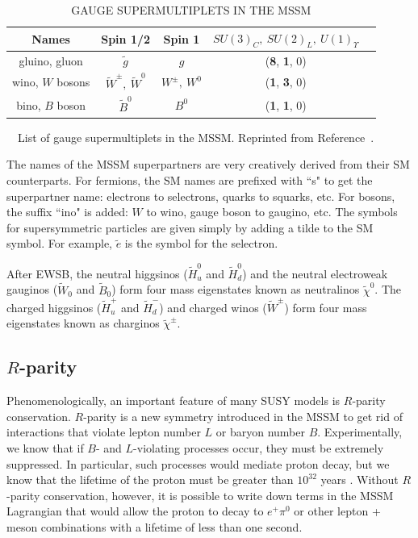 \begin{table}[ht]
    \caption{GAUGE SUPERMULTIPLETS IN THE MSSM}
    \centering
        \begin{threeparttable}
    \begin{tabular}{|c|c|c|c|c|}
    \hline
    \hline
    Names & Spin 1/2 & Spin 1 &$SU(3)_C,~SU(2)_L,~U(1)_\Upsilon $\\
  	  \hline
           \hline    
gluino, gluon & $\tilde{g}$ & $g$   & (\textbf{8}, \textbf{1}, 0) \\
\hline
wino, $W$ bosons & $\widetilde{W}^\pm,~\widetilde{W}^0$ & $W^\pm,~W^0$ & (\textbf{1}, \textbf{3}, 0) \\
\hline
bino, $B$ boson & $\widetilde{B}^0$ & $B^0$ & (\textbf{1}, \textbf{1}, 0) \\
           \hline
           \hline
    \end{tabular}
    \label{tab:SUSY_bosons}
        \begin{tablenotes}
\footnotesize
\item{~~List of gauge supermultiplets in the MSSM. Reprinted from Reference~\cite{SUSYprimer}.}
\end{tablenotes}
\end{threeparttable}
\end{table}

The names of the MSSM superpartners are very creatively derived from their SM counterparts. For fermions, the SM names are prefixed with ``s" to get the superpartner name: electrons to selectrons, quarks to squarks, etc. For bosons, the suffix ``ino" is added: $W$ to wino, gauge boson to gaugino, etc. The symbols for supersymmetric particles are given simply by adding a tilde to the SM symbol. For example, $\tilde{e}$ is the symbol for the selectron.

After EWSB, the neutral higgsinos ($\widetilde{H}_u^0$ and $\widetilde{H}_d^0$) and the neutral electroweak gauginos ($\widetilde{W}_0$ and $\widetilde{B}_0$) form four mass eigenstates known as neutralinos $\widetilde{\chi}^0$. The charged higgsinos ($\widetilde{H}_u^+$ and $\widetilde{H}_d^-$) and charged winos ($\widetilde{W}^\pm$) form four mass eigenstates known as charginos $\widetilde{\chi}^\pm$. 



\subsection{$R$-parity}
\label{sec:Rparity}
Phenomenologically, an important feature of many SUSY models is $R$-parity conservation.
$R$-parity is a new symmetry introduced in the MSSM to get rid of interactions that violate lepton number $L$
or baryon number $B$. 
Experimentally, we know that if $B$- and $L$-violating processes occur, they must be extremely suppressed. 
In particular, such processes would mediate proton decay, but we know that the 
lifetime of the proton must be greater than $10^{32}$ years \cite{SUSYprimer}. 
Without $R$-parity conservation, however, it is possible to write down terms in the MSSM Lagrangian 
that would allow the proton to decay to $e^+\pi^0$ or other 
lepton + meson combinations with a lifetime of less than one second.

